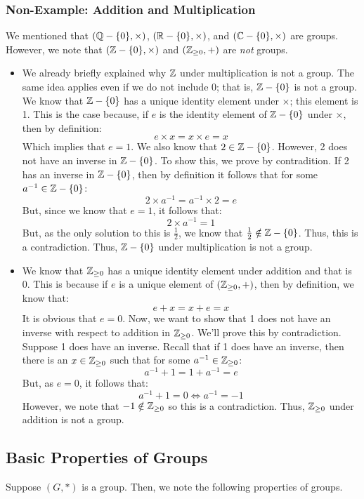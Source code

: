 \documentclass[letterpaper]{article}
\begin{document}
\subsubsection{Non-Example: Addition and Multiplication}
We mentioned that $(\mathbb{Q} - \{0\}, \times)$, $(\mathbb{R} - \{0\}, \times)$, and $(\mathbb{C} - \{0\}, \times)$ are groups. However, we note that $(\mathbb{Z} - \{0\}, \times)$ and $(\mathbb{Z}_{\geq 0}, +)$ are \emph{not} groups. 
\begin{itemize}
    \item We already briefly explained why $\mathbb{Z}$ under multiplication is not a group. The same idea applies even if we do not include 0; that is, $\mathbb{Z} - \{0\}$ is not a group. We know that $\mathbb{Z} - \{0\}$ has a unique identity element under $\times$; this element is 1. This is the case because, if $e$ is the identity element of $\mathbb{Z} - \{0\}$ under $\times$, then by definition: 
    \[e \times x = x \times e = x\]
    Which implies that $e = 1$. We also know that $2 \in \mathbb{Z} - \{0\}$. However, 2 does not have an inverse in $\mathbb{Z} - \{0\}$. To show this, we prove by contradition. If 2 has an inverse in $\mathbb{Z} - \{0\}$, then by definition it follows that for some $a^{-1} \in \mathbb{Z} - \{0\}$:
    \[2 \times a^{-1} = a^{-1} \times 2 = e\]
    But, since we know that $e = 1$, it follows that:
    \[2 \times a^{-1}= 1\]
    But, as the only solution to this is $\frac{1}{2}$, we know that $\frac{1}{2} \notin \mathbb{Z} - \{0\}$. Thus, this is a contradiction. Thus, $\mathbb{Z} - \{0\}$ under multiplication is not a group. 

    \item We know that $\mathbb{Z}_{\geq 0}$ has a unique identity element under addition and that is 0. This is because if $e$ is a unique element of $(\mathbb{Z}_{\geq 0}, +)$, then by definition, we know that: 
    \[e + x = x + e = x\]
    It is obvious that $e = 0$. Now, we want to show that 1 does not have an inverse with respect to addition in $\mathbb{Z}_{\geq 0}$. We'll prove this by contradiction. Suppose 1 does have an inverse. Recall that if 1 does have an inverse, then there is an $x \in \mathbb{Z}_{\geq 0}$ such that for some $a^{-1} \in \mathbb{Z}_{\geq 0}$:
    \[a^{-1} + 1 = 1 + a^{-1} = e\]
    But, as $e = 0$, it follows that: 
    \[a^{-1} + 1 = 0 \iff a^{-1} = -1\]
    However, we note that $-1 \notin \mathbb{Z}_{\geq 0}$ so this is a contradiction. Thus, $\mathbb{Z}_{\geq 0}$ under addition is not a group.
\end{itemize}

\subsection{Basic Properties of Groups}
Suppose $(G, *)$ is a group. Then, we note the following properties of groups. 
\end{document}
